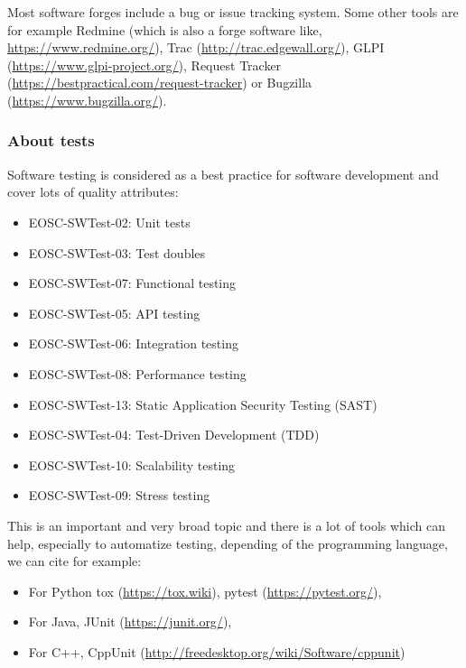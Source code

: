 Most software forges include a bug or issue tracking system. Some
other tools are for example Redmine (which is also a forge software
like, \url{https://www.redmine.org/}), Trac
(\url{http://trac.edgewall.org/}), GLPI
(\url{https://www.glpi-project.org/}), Request Tracker
(\url{https://bestpractical.com/request-tracker}) or Bugzilla
(\url{https://www.bugzilla.org/}).


\subsubsection{About tests}

Software testing is considered as a best practice for software
development and cover lots of quality attributes:

\begin{itemize}
  \item EOSC-SWTest-02: Unit tests
  \item EOSC-SWTest-03: Test doubles
  \item EOSC-SWTest-07: Functional testing
  \item EOSC-SWTest-05: API testing
  \item EOSC-SWTest-06: Integration testing
  \item EOSC-SWTest-08: Performance testing
  \item EOSC-SWTest-13: Static Application Security Testing (SAST)
  \item EOSC-SWTest-04: Test-Driven Development (TDD)
  \item EOSC-SWTest-10: Scalability testing
  \item EOSC-SWTest-09: Stress testing
\end{itemize}

This is an important and very broad topic and there is a lot of tools
which can help, especially to automatize testing, depending of the
programming language, we can cite for example:

\begin{itemize}
\item For Python tox
  (\url{https://tox.wiki}), pytest (\url{https://pytest.org/}),
\item For Java, JUnit (\url{https://junit.org/}),
\item For C++, CppUnit (\url{http://freedesktop.org/wiki/Software/cppunit})
\end{itemize}

